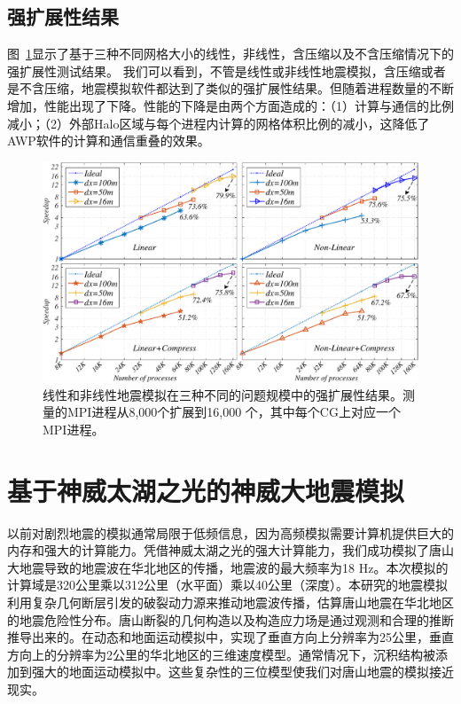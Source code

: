 \documentclass[degree=doctor]{thuthesis}
\begin{document}
\subsection{强扩展性结果}

图~\ref {fig:strong-scaling}显示了基于三种不同网格大小的线性，非线性，含压缩以及不含压缩情况下的强扩展性测试结果。 我们可以看到，不管是线性或非线性地震模拟，含压缩或者是不含压缩，地震模拟软件都达到了类似的强扩展性结果。但随着进程数量的不断增加，性能出现了下降。性能的下降是由两个方面造成的：（1）计算与通信的比例减小；（2）外部Halo区域与每个进程内计算的网格体积比例的减小，这降低了AWP软件的计算和通信重叠的效果。


\begin{figure}[ht]
\centering
\includegraphics[width=1.0\columnwidth]{strong_scaling.pdf}
\caption{线性和非线性地震模拟在三种不同的问题规模中的强扩展性结果。测量的MPI进程从8,000个扩展到16,000 个，其中每个CG上对应一个MPI进程。}
\label{fig:strong-scaling}
\end{figure}

\section{基于神威太湖之光的神威大地震模拟}

以前对剧烈地震的模拟通常局限于低频信息，因为高频模拟需要计算机提供巨大的内存和强大的计算能力。凭借神威太湖之光的强大计算能力，我们成功模拟了唐山大地震导致的地震波在华北地区的传播，地震波的最大频率为18 Hz。本次模拟的计算域是320公里乘以312公里（水平面）乘以40公里（深度）。本研究的地震模拟利用复杂几何断层引发的破裂动力源来推动地震波传播，估算唐山地震在华北地区的地震危险性分布。唐山断裂的几何构造以及构造应力场是通过观测和合理的推断推导出来的。在动态和地面运动模拟中，实现了垂直方向上分辨率为25公里，垂直方向上的分辨率为2公里的华北地区的三维速度模型。通常情况下，沉积结构被添加到强大的地面运动模拟中。这些复杂性的三位模型使我们对唐山地震的模拟接近现实。
\end{document}
